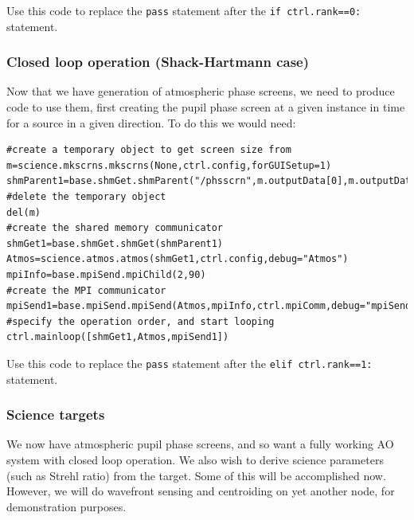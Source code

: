 \documentclass{article}
\begin{document}
Use this code to replace the \texttt{pass} statement after the
\texttt{if ctrl.rank==0:} statement.

\subsubsection{Closed loop operation (Shack-Hartmann case)}
Now that we have generation of atmospheric phase screens, we need to
produce code to use them, first creating the pupil phase screen at a
given instance in time for a source in a given direction.  To do this
we would need:

\begin{verbatim}
#create a temporary object to get screen size from
m=science.mkscrns.mkscrns(None,ctrl.config,forGUISetup=1)
shmParent1=base.shmGet.shmParent("/phsscrn",m.outputData[0],m.outputData[1],0,1)
#delete the temporary object
del(m)
#create the shared memory communicator
shmGet1=base.shmGet.shmGet(shmParent1)
Atmos=science.atmos.atmos(shmGet1,ctrl.config,debug="Atmos")
mpiInfo=base.mpiSend.mpiChild(2,90)
#create the MPI communicator
mpiSend1=base.mpiSend.mpiSend(Atmos,mpiInfo,ctrl.mpiComm,debug="mpiSend1")
#specify the operation order, and start looping
ctrl.mainloop([shmGet1,Atmos,mpiSend1])
\end{verbatim}

Use this code to replace the \texttt{pass} statement after the
\texttt{elif ctrl.rank==1:} statement.

\subsubsection{Science targets}
We now have atmospheric pupil phase screens, and so want a fully
working AO system with closed loop operation.  We also wish to derive
science parameters (such as Strehl ratio) from the target.  Some of
this will be accomplished now.  However, we will do wavefront sensing
and centroiding on yet another node, for demonstration purposes.
\end{document}
